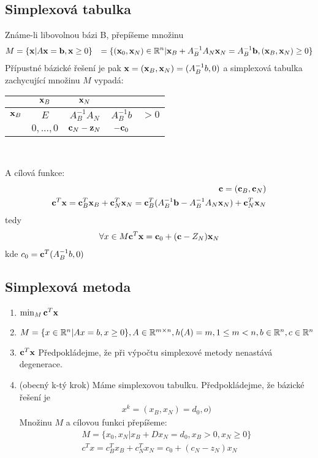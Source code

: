 \documentclass[a4paper,12pt,titlepage]{article}
\begin{document}
\subsection{Simplexová tabulka}
\setcounter{equation}{0}
Známe-li libovolnou bázi B, přepíšeme množinu 
\begin{align}
	M &= \{ \mathbf{x} | A \mathbf{x} = \mathbf{b}, \mathbf{x} \ge0 \} 
	&= \{ (\mathbf{x}_0, \mathbf{x}_N) \in \mathbb{R}^n | \mathbf{x}_B + A_B^{-1} A_N \mathbf{x}_N = A_B^{-1} \mathbf{b},
	(\mathbf{x}_B, \mathbf{x}_N) \ge 0 \}
\end{align}
Přípustné bázické řešení je pak $\mathbf{x} = (\mathbf{x}_B, \mathbf{x}_N) = (A_B^{-1} b, 0)$
a simplexová tabulka zachycující množinu $M$ vypadá: \\
\begin{center}
\begin{tabular}{|c||c|c|cl|}
	\hline
	        & $\mathbf{x}_B$     & $\mathbf{x}_N$        &              &     \\
	\hline
	\hline
	$\mathbf{x}_B$ & $E$         & $A_B^{-1} A_N$ & $A_B^{-1} b$ & $> 0$\\
	\hline
	        & $0, ..., 0$ & $\mathbf{c}_N - \mathbf{z}_N$ & $-\mathbf{c}_0$     & \\
	\hline
\end{tabular} \\
\end{center}
A cílová funkce:
\begin{align}
	\mathbf{c} = (\mathbf{c}_B, \mathbf{c}_N) \\
	\mathbf{c}^T \mathbf{x} = \mathbf{c}_B^T \mathbf{x}_B + \mathbf{c}_N^T \mathbf{x}_N = \mathbf{c}_B^T( A_B^{-1} \mathbf{b} -
	A_B^{-1}A_N \mathbf{x}_N) + \mathbf{c}_N^T \mathbf{x}_N
\end{align}
tedy
\begin{align}
	\forall x \in M \mathbf{c}^T \mathbf{x} = \mathbf{c}_0 + (\mathbf{c} - Z_N) \mathbf{x}_N
\end{align}
kde $c_0 = \mathbf{c}^T(A_B^{-1} b, 0)$


\subsection{Simplexová metoda}
\setcounter{equation}{0}
\begin{enumerate}
	\item $\min_M \mathbf{c}^T \mathbf{x}$
	\item $M = \{ x \in \mathbb{R}^n | Ax = b, x \ge 0 \}, A \in \mathbb{R}^{m \times n}, h(A) =
	m, 1 \le m < n, b \in \mathbb{R}^n, c \in \mathbb{R}^n$
	\item $\mathbf{c}^T\mathbf{x}$ Předpokládejme, že při výpočtu simplexové metody nenastává
	degenerace.
	\item (obecný k-tý krok) Máme simplexovou tabulku. Předpokládejme, že
	bázické řešení je 
	\begin{align}
		x^k = (x_B, x_N) = d_0, o)
	\end{align}
	Množinu $M$ a cílovou funkci přepíšeme:
	\begin{align}
		M = \{ x_0, x_N | x_B + Dx_N = d_0, x_B > 0, x_N \ge 0 \} \\
		c^Tx = c_B^T x_B + c_N^Tx_N = c_0 + (c_N - z_N) x_N
	\end{align}
\end{enumerate}
\end{document}
